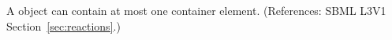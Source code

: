 A \KineticLaw object can contain at most one \ListOfLocalParameters
container element.  (References: SBML L3V1 Section~\ref{sec:reactions}.)
